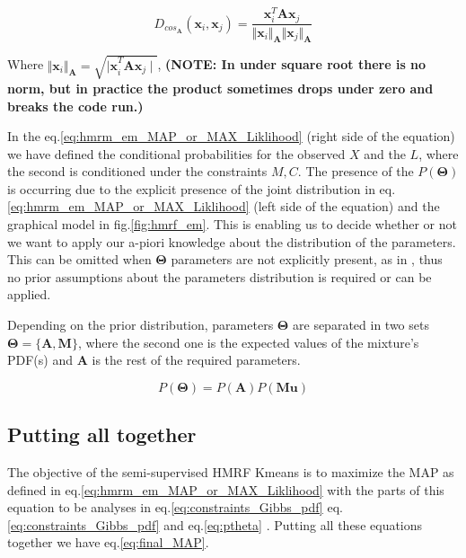 \documentclass[dvips,dvipdfm,pdftex]{llncs}
\begin{document}
\begin{equation}
	D_{cos_{\mathbf{A}}}(\mathbf{x}_{i},\mathbf{x}_{j})=\frac{\mathbf{x}_{i}^{T}\mathbf{A}\mathbf{x}_{j}}{\Vert\mathbf{x}_{i}\Vert_{\mathbf{A}}\Vert\mathbf{x}_{j}\Vert_{\mathbf{A}}}
	\label{eq:parametrized_cos_sim}
\end{equation}

Where $\Vert\mathbf{x}_{i}\Vert_{\mathbf{A}}=\sqrt{\mathbf{\mid x}_{i}^{T}\mathbf{A}\mathbf{x}_{j} \mid}$, \textbf{(NOTE: In \cite{basu2004probabilistic} under square root there is no norm, but in practice the product sometimes drops under zero and breaks the code run.)}

In the eq.\ref{eq:hmrm_em_MAP_or_MAX_Liklihood} (right side of the equation) we have defined the conditional probabilities for the observed $X$ and the $L$, where the second is conditioned under the constraints ${M,C}$. The presence of the $P(\mathbf{\Theta})$ is occurring due to the explicit presence of the joint distribution in eq.\ref{eq:hmrm_em_MAP_or_MAX_Liklihood} (left side of the equation) and the graphical model in fig.\ref{fig:hmrf_em}. This is enabling us to decide whether or not we want to apply our a-piori knowledge about the distribution of the parameters. This can be omitted when $\mathbf{\Theta}$ parameters are not explicitly present, as in \cite{basu2004probabilistic}, thus no prior assumptions about the parameters distribution is required or can be applied.

Depending on the prior distribution, parameters $\mathbf{\Theta}$ are separated in two sets $\mathbf{\Theta}=\{\mathbf{A},\mathbf{M}\}$, where the second one is the expected values of the mixture's PDF(s) and $\mathbf{A}$ is the rest of the required parameters.

\begin{equation}
	P(\mathbf{\Theta})=P(\mathbf{A})P(\mathbf{Mu})
\label{eq:ptheta}
\end{equation}


\subsection{Putting all together}

The objective of the semi-supervised HMRF Kmeans is to maximize the MAP as defined in eq.\ref{eq:hmrm_em_MAP_or_MAX_Liklihood} with the parts of this equation to be analyses in eq.\ref{eq:constraints_Gibbs_pdf} eq.\ref{eq:constraints_Gibbs_pdf} and eq.\ref{eq:ptheta} . Putting all these equations together we have eq.\ref{eq:final_MAP}.
\end{document}
